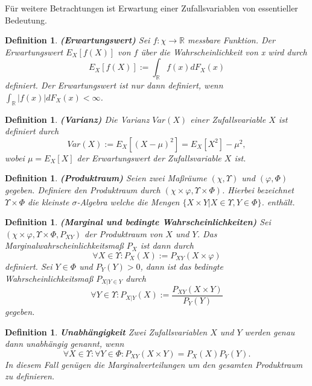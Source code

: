 \documentclass[12pt,a4paper]{scrartcl}
\newtheorem{Definition}[Satz]{Definition}
\numberwithin{equation}{section}
\newcommand{\R}{\mathbb{R}} %
\begin{document}
Für weitere Betrachtungen ist Erwartung einer Zufallsvariablen von essentieller Bedeutung. 

\begin{Definition}\textbf{(Erwartungswert)}
 Sei $f: \chi \rightarrow \R $ messbare Funktion. Der Erwartungswert $E_{X}[f(X)]$ von $f$
 über die Wahrscheinlichkeit von x wird durch 
 $$
 E_{X}[f(X)] := \int_{\R}f(x)dF_{X}(x)
 $$
 definiert. Der Erwartungswert ist nur dann definiert, wenn $\int_{\R}|f(x)|dF_{X}(x) < \infty$.
\end{Definition}

\begin{Definition}\textbf{(Varianz)}
 Die Varianz $Var(X)$ einer Zufallsvariable $X$ ist definiert durch 
 $$
 Var(X) := E_{X}[(X-\mu)^{2}] = E_{X}[X^{2}] - \mu^{2},
 $$
 wobei $\mu = E_{X}[X]$ der Erwartungswert der Zufallsvariable $X$ ist.  
\end{Definition}

\begin{Definition}\textbf{(Produktraum)}
 Seien zwei Maßräume $(\chi,\varUpsilon)$ und $(\varphi,\Phi)$ gegeben. Definiere den 
 Produktraum durch $(\chi \times \varphi,\varUpsilon \times \Phi)$. Hierbei bezeichnet
 $\varUpsilon \times \Phi$ die kleinste $\sigma$-Algebra welche die Mengen $\textit{\{}X \times Y | X \in \varUpsilon, Y \in \Phi\textit{\}}$.
 enthält.
 \end{Definition}

\begin{Definition}\textbf{(Marginal und bedingte Wahrscheinlichkeiten)}
  Sei $(\chi \times \varphi,\varUpsilon \times \Phi, P_{XY})$ der Produktraum von $X$ und $Y$.
  Das Marginalwahrscheinlichkeitsmaß $P_{X}$ ist dann durch 
  $$
  \forall X \in \varUpsilon: P_{X}(X) := P_{XY}(X \times \varphi)
  $$
  definiert.
  Sei $Y \in \Phi$ und $P_{Y}(Y) > 0$, dann ist das bedingte Wahrscheinlichkeitsmaß $P_{X|Y \in Y}$ durch
  $$
  \forall Y \in \varUpsilon: P_{X|Y}(X) := \frac{P_{XY}(X \times Y)}{P_{Y}(Y)}
  $$
  gegeben.
\end{Definition}

\begin{Definition}\textbf{Unabhängigkeit}
  Zwei Zufallsvariablen $X$ und $Y$ werden genau dann unabhängig genannt, wenn 
  $$
  \forall X \in \varUpsilon: \forall Y \in \Phi: P_{XY}(X \times Y) = P_{X}(X)P_{Y}(Y).
  $$
  In diesem Fall genügen die Marginalverteilungen um den gesamten Produktraum zu definieren.
\end{Definition}
  
\end{document}
